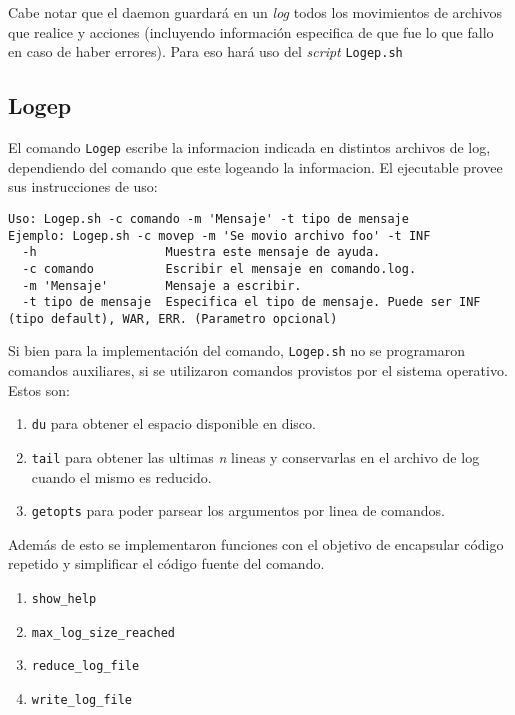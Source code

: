 \documentclass[10pt,a4paper]{article}
\begin{document}
Cabe notar que el daemon guardará en un \textit{log} todos los movimientos de archivos que realice y acciones (incluyendo información especifica de que fue lo que fallo en caso de haber errores). Para eso hará uso del \textit{script} \texttt{Logep.sh}

\subsection{Logep}
El comando \texttt{Logep} escribe la informacion indicada en distintos archivos de log, dependiendo del comando que este logeando la informacion. El ejecutable provee sus instrucciones de uso:

\begin{lstlisting}
Uso: Logep.sh -c comando -m 'Mensaje' -t tipo de mensaje
Ejemplo: Logep.sh -c movep -m 'Se movio archivo foo' -t INF 
  -h                  Muestra este mensaje de ayuda.
  -c comando          Escribir el mensaje en comando.log.
  -m 'Mensaje'        Mensaje a escribir.
  -t tipo de mensaje  Especifica el tipo de mensaje. Puede ser INF (tipo default), WAR, ERR. (Parametro opcional)
\end{lstlisting}

Si bien para la implementación del comando, \texttt{Logep.sh} no se programaron comandos auxiliares, si se utilizaron comandos provistos por el sistema operativo. Estos son:

\begin{enumerate}
    \item \texttt{du} para obtener el espacio disponible en disco.
    \item \texttt{tail} para obtener las ultimas \textit{n} lineas y conservarlas en el archivo de log cuando el mismo es reducido.
    \item \texttt{getopts} para poder parsear los argumentos por linea de comandos.
\end{enumerate}


Además de esto se implementaron funciones con el objetivo de encapsular código repetido y simplificar el código fuente del comando.

\begin{enumerate}
    \item \texttt{show\_help}
    \item \texttt{max\_log\_size\_reached}
    \item \texttt{reduce\_log\_file}
    \item \texttt{write\_log\_file}
\end{enumerate}
\end{document}
